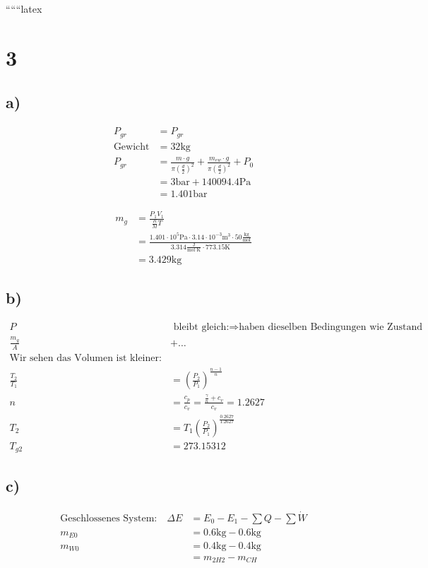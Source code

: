 
``````latex


\section*{3}

\subsection*{a)}
\begin{align*}
P_{gr} &= P_{gr} \\
\text{Gewicht} &= 32 \text{kg} \\
P_{gr} &= \frac{m \cdot g}{\pi \left(\frac{d}{2}\right)^2} + \frac{m_{ew} \cdot g}{\pi \left(\frac{d}{2}\right)^2} + P_0 \\
&= 3 \text{bar} + 140094.4 \text{Pa} \\
&= 1.401 \text{bar}
\end{align*}

\begin{align*}
m_g &= \frac{P_1 V_1}{\frac{R}{M} T} \\
&= \frac{1.401 \cdot 10^5 \text{Pa} \cdot 3.14 \cdot 10^{-3} \text{m}^3 \cdot 50 \frac{\text{kg}}{\text{mol}}}{3.314 \frac{\text{J}}{\text{mol K}} \cdot 773.15 \text{K}} \\
&= 3.429 \text{kg}
\end{align*}

\subsection*{b)}
\begin{align*}
P &\text{ bleibt gleich:} \Rightarrow \text{haben dieselben Bedingungen wie Zustand 1} \\
\frac{m_g}{A} &+ \ldots \\
\text{Wir sehen das Volumen ist kleiner: aus Gas-Gesetz folgt} \\
\frac{T_2}{T_1} &= \left(\frac{P_2}{P_1}\right)^{\frac{n-1}{n}} \\
n &= \frac{c_p}{c_v} = \frac{\frac{\gamma}{n} + c_v}{c_v} = 1.2627 \\
T_2 &= T_1 \left(\frac{P_2}{P_1}\right)^{\frac{0.2627}{1.2627}} \\
T_{g2} &= 273.15312
\end{align*}

\subsection*{c)}
\begin{align*}
\text{Geschlossenes System:} \quad \Delta E &= E_0 - E_1 - \sum Q - \sum \dot{W} \\
m_{E0} &= 0.6 \text{kg} - 0.6 \text{kg} \\
m_{W0} &= 0.4 \text{kg} - 0.4 \text{kg} \\
&= m_{2H2} - m_{CH}
\end{align*}

